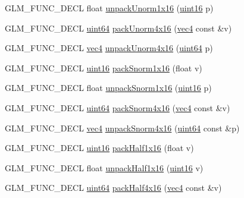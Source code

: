 \begin{CompactItemize}
\item 
GLM\_\-FUNC\_\-DECL float \hyperlink{group__gtc__packing_g7770e3ade4f4764cc1b2eb42ac4ec188}{unpackUnorm1x16} (\hyperlink{group__gtc__type__precision_gd8c2939e1fdd8e5828b31d95c52255d5}{uint16} p)
\item 
GLM\_\-FUNC\_\-DECL \hyperlink{group__gtc__type__precision_ge3632bf9b37da66233d78930dd06378a}{uint64} \hyperlink{group__gtc__packing_gc561f06c908b7302537a8ef29fcb409e}{packUnorm4x16} (\hyperlink{group__core__types_g5881b1b022d7fd1b7218f5916532dd02}{vec4} const \&v)
\item 
GLM\_\-FUNC\_\-DECL \hyperlink{group__core__types_g5881b1b022d7fd1b7218f5916532dd02}{vec4} \hyperlink{group__gtc__packing_gfb2b502bc406031a5618ce930139a9e3}{unpackUnorm4x16} (\hyperlink{group__gtc__type__precision_ge3632bf9b37da66233d78930dd06378a}{uint64} p)
\item 
GLM\_\-FUNC\_\-DECL \hyperlink{group__gtc__type__precision_gd8c2939e1fdd8e5828b31d95c52255d5}{uint16} \hyperlink{group__gtc__packing_gc29411d6c0f6ed0fe9f0396dfe92e0e8}{packSnorm1x16} (float v)
\item 
GLM\_\-FUNC\_\-DECL float \hyperlink{group__gtc__packing_g246f451cebf590726324f7a283e3d65e}{unpackSnorm1x16} (\hyperlink{group__gtc__type__precision_gd8c2939e1fdd8e5828b31d95c52255d5}{uint16} p)
\item 
GLM\_\-FUNC\_\-DECL \hyperlink{group__gtc__type__precision_ge3632bf9b37da66233d78930dd06378a}{uint64} \hyperlink{group__gtc__packing_g9b237d7c66b7a71964e6d1f4dc06539f}{packSnorm4x16} (\hyperlink{group__core__types_g5881b1b022d7fd1b7218f5916532dd02}{vec4} const \&v)
\item 
GLM\_\-FUNC\_\-DECL \hyperlink{group__core__types_g5881b1b022d7fd1b7218f5916532dd02}{vec4} \hyperlink{group__gtc__packing_gdb01fc0530f07beb509c89d97b6f4d20}{unpackSnorm4x16} (\hyperlink{group__gtc__type__precision_ge3632bf9b37da66233d78930dd06378a}{uint64} const \&p)
\item 
GLM\_\-FUNC\_\-DECL \hyperlink{group__gtc__type__precision_gd8c2939e1fdd8e5828b31d95c52255d5}{uint16} \hyperlink{group__gtc__packing_gba534b320836a35372e00af5771dd1a2}{packHalf1x16} (float v)
\item 
GLM\_\-FUNC\_\-DECL float \hyperlink{group__gtc__packing_ga6eebcdfc746584b7d1823f1d5344fed}{unpackHalf1x16} (\hyperlink{group__gtc__type__precision_gd8c2939e1fdd8e5828b31d95c52255d5}{uint16} v)
\item 
GLM\_\-FUNC\_\-DECL \hyperlink{group__gtc__type__precision_ge3632bf9b37da66233d78930dd06378a}{uint64} \hyperlink{group__gtc__packing_g8104f0b719b7792491f2b789a6dd6f96}{packHalf4x16} (\hyperlink{group__core__types_g5881b1b022d7fd1b7218f5916532dd02}{vec4} const \&v)

\end{CompactItemize}
